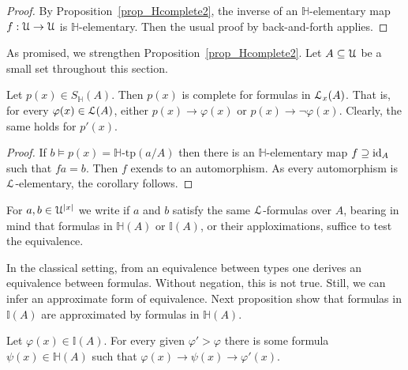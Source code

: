 \documentclass[10pt,oneside]{amsproc}
\renewcommand*{\emph}[1]{%
   \smash{\tikz[baseline]\node[rectangle, fill=teal!25, rounded corners, inner xsep=0.5ex, inner ysep=0.2ex, anchor=base, minimum height = 2.7ex]{#1};}}
\begin{document}
\begin{proof}
  By Proposition~\ref{prop_Hcomplete2}, the inverse of an $\mathds{H}$-elementary map $f:{\EuScript U}\to{\EuScript U}$ is $\mathds{H}$-elementary.
  Then the usual proof by back-and-forth applies.
\end{proof}

As promised, we strengthen Proposition~\ref{prop_Hcomplete2}.
Let $A\subseteq{\EuScript U}$ be a small set throughout this section.

\begin{corollary}\label{corol_Lcomplete}
  Let $p(x)\in S_\mathds{H}(A)$.
  Then $p(x)$ is complete for formulas in ${\EuScript L}_x(A)$.
  That is, for every $\varphi(x)\in{\EuScript L}(A)$, either $p(x)\rightarrow\varphi(x)$ or $p(x)\rightarrow\neg\varphi(x)$.
  Clearly, the same holds for $p'(x)$.
\end{corollary}

\begin{proof}
  If $b\models p(x)=\mathds{H}\mbox{-tp}(a/A)$ then there is an $\mathds{H}$-elementary map $f\supseteq{\rm id}_A$ such that $fa=b$.
  Then $f$ exends to an automorphism.
  As every automorphism is ${\EuScript L}$-elementary, the corollary follows.
\end{proof}

For $a,b\in {\EuScript U}^{|x|}$ we write \emph{$a\equiv_Ab$\/} if $a$ and $b$ satisfy the same ${\EuScript L}$-formulas over $A$, bearing in mind that formulas in $\mathds{H}(A)$ or $\mathds{I}(A)$, or their apploximations, suffice to test the equivalence.

In the classical setting, from an equivalence between types one derives an  equivalence between formulas.
Without negation, this is not true.
Still, we can infer an approximate form of equivalence.
Next proposition show that formulas in $\mathds{I}(A)$ are approximated by formulas in $\mathds{H}(A)$.

\begin{proposition}\label{prop_LHapprox1}
  Let $\varphi(x)\in\mathds{I}(A)$.
  For every given $\varphi'>\varphi$ there is some formula $\psi(x)\in\mathds{H}(A)$ such that $\varphi(x)\rightarrow\psi(x)\rightarrow\varphi'(x)$.
\end{proposition}
\end{document}
